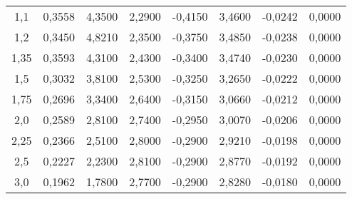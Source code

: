 \begin{table}[ht]
\begin{tabular}{c|c|c|c|c|c|c|c}
1,1   & 0,3558  & 4,3500 & 2,2900 & -0,4150 & 3,4600 & -0,0242 & 0,0000 \\
1,2   & 0,3450  & 4,8210 & 2,3500 & -0,3750 & 3,4850 & -0,0238 & 0,0000 \\
1,35  & 0,3593  & 4,3100 & 2,4300 & -0,3400 & 3,4740 & -0,0230 & 0,0000 \\
1,5   & 0,3032  & 3,8100 & 2,5300 & -0,3250 & 3,2650 & -0,0222 & 0,0000 \\
1,75  & 0,2696  & 3,3400 & 2,6400 & -0,3150 & 3,0660 & -0,0212 & 0,0000 \\
2,0   & 0,2589  & 2,8100 & 2,7400 & -0,2950 & 3,0070 & -0,0206 & 0,0000 \\
2,25  & 0,2366  & 2,5100 & 2,8000 & -0,2900 & 2,9210 & -0,0198 & 0,0000 \\
2,5   & 0,2227  & 2,2300 & 2,8100 & -0,2900 & 2,8770 & -0,0192 & 0,0000 \\
3,0   & 0,1962  & 1,7800 & 2,7700 & -0,2900 & 2,8280 & -0,0180 & 0,0000
\end{tabular}
\label{tab:apendice-coeficientes-sembasebleed}
\end{table}